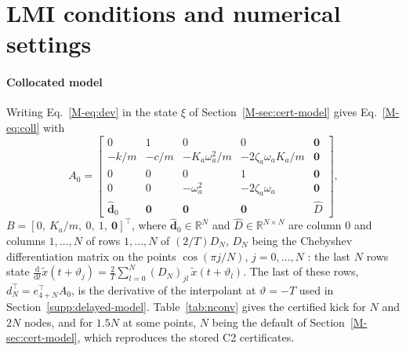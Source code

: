 \section{LMI conditions and numerical settings}\label{app:lmi}

\paragraph{Collocated model}
Writing Eq.~\eqref{M-eq:dev} in the state $\xi$ of Section~\ref{M-sec:cert-model} gives Eq.~\eqref{M-eq:coll} with
\begin{equation}\label{eq:app-A0}
A_0=\begin{bmatrix}
0&1&0&0&\bm 0\\
-k/m&-c/m&-K_a\omega_a^2/m&-2\zeta_a\omega_aK_a/m&\bm 0\\
0&0&0&1&\bm 0\\
0&0&-\omega_a^2&-2\zeta_a\omega_a&\bm 0\\
\hat{\bm d}_0&\bm 0&\bm 0&\bm 0&\hat D
\end{bmatrix},
\end{equation}
$B=[0,\ K_a/m,\ 0,\ 1,\ \bm 0]^\top$, where $\hat{\bm d}_0\in\mathbb R^N$ and $\hat D\in\mathbb R^{N\times N}$ are column 0 and columns $1,\dots,N$ of rows $1,\dots,N$ of $(2/T)D_N$, $D_N$ being the Chebyshev differentiation matrix on the points $\cos(\pi j/N)$, $j=0,\dots,N$ \citep{trefethen2000spectral}: the last $N$ rows state $\tfrac{\mathrm d}{\mathrm dt}\tilde x(t+\vartheta_j)=\tfrac2T\sum_{l=0}^{N}(D_N)_{jl}\,\tilde x(t+\vartheta_l)$. The last of these rows, $d_N^\top=e_{4+N}^\top A_0$, is the derivative of the interpolant at $\vartheta=-T$ used in Section~\ref{supp:delayed-model}. Table~\ref{tab:nconv} gives the certified kick for $N$ and $2N$ nodes, and for $1.5N$ at some points, $N$ being the default of Section~\ref{M-sec:cert-model}, which reproduces the stored C2 certificates.

